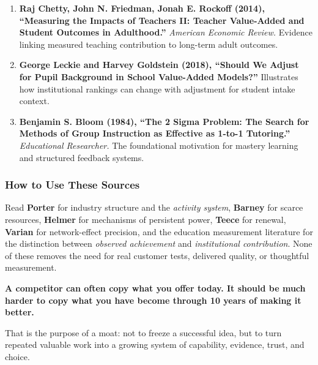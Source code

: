 \begin{enumerate}
    \item \textbf{Raj Chetty, John N. Friedman, Jonah E. Rockoff (2014), ``Measuring the Impacts of Teachers II: Teacher Value-Added and Student Outcomes in Adulthood.''} \textit{American Economic Review.} Evidence linking measured teaching contribution to long-term adult outcomes.
    \item \textbf{George Leckie and Harvey Goldstein (2018), ``Should We Adjust for Pupil Background in School Value-Added Models?''} Illustrates how institutional rankings can change with adjustment for student intake context.
    \item \textbf{Benjamin S. Bloom (1984), ``The 2 Sigma Problem: The Search for Methods of Group Instruction as Effective as 1-to-1 Tutoring.''} \textit{Educational Researcher.} The foundational motivation for mastery learning and structured feedback systems.
\end{enumerate}

\subsubsection*{How to Use These Sources}
Read \textbf{Porter} for industry structure and the \textit{activity system}, \textbf{Barney} for scarce resources, \textbf{Helmer} for mechanisms of persistent power, \textbf{Teece} for renewal, \textbf{Varian} for network-effect precision, and the education measurement literature for the distinction between \textit{observed achievement} and \textit{institutional contribution}. None of these removes the need for real customer tests, delivered quality, or thoughtful measurement.

\vspace{1em}
\begin{tcolorbox}[colback=black!5,colframe=black!75,arc=1mm,title=\textbf{The Final Principle}]
\textbf{A competitor can often copy what you offer today. It should be much harder to copy what you have become through 10 years of making it better.}

\vspace{0.5em}
That is the purpose of a moat: not to freeze a successful idea, but to turn repeated valuable work into a growing system of capability, evidence, trust, and choice.
\end{tcolorbox}
